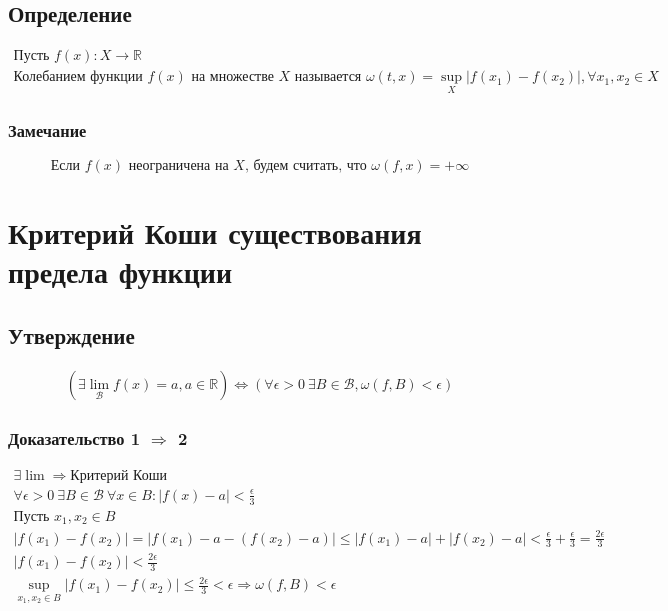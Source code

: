 \documentclass{article}
\begin{document}
\subsection{Определение}
\begin{gather*}
    \text{Пусть } f(x): X \rightarrow \mathbb{R} \\
    \text{Колебанием функции } f(x) \text{ на множестве } X \text{ называется } \omega(t, x) = \sup_X |f(x_1) - f(x_2)|, \forall x_1, x_2 \in X
\end{gather*}

\subsubsection{Замечание}
\[
    \text{Если } f(x) \text{ неограничена на } X \text{, будем считать, что } \omega(f, x) = +\infty
\]



\section{Критерий Коши существования предела функции}

\subsection{Утверждение}
\begin{gather*}
    \left( \exists \lim_{\mathcal{B}} f(x) = a, a \in \mathbb{R} \right) \Leftrightarrow 
    \left( \forall \epsilon > 0 ~ \exists B \in \mathcal{B}, \omega(f, B) < \epsilon \right)
\end{gather*}

\subsubsection{Доказательство 1 $\Rightarrow$ 2}
\begin{gather*}
    \exists \lim \Rightarrow \text{Критерий Коши} \\
    \forall \epsilon > 0 ~ \exists B \in \mathcal{B} ~ \forall x \in B: |f(x) - a| < \frac{\epsilon}{3} \\
    \text{Пусть } x_1, x_2 \in B \\
    |f(x_1) - f(x_2)| = |f(x_1) - a - (f(x_2) - a)| \le |f(x_1) - a| + |f(x_2) - a| < \frac{\epsilon}{3} + \frac{\epsilon}{3} = \frac{2 \epsilon}{3} \\
    |f(x_1) - f(x_2)| < \frac{2 \epsilon}{3} \\
    \sup_{x_1, x_2 \in B} |f(x_1) - f(x_2)| \le \frac{2 \epsilon}{3} < \epsilon \Rightarrow
    \omega(f, B) < \epsilon
\end{gather*}
\end{document}
